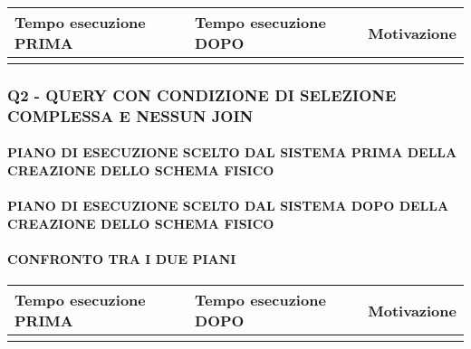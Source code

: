 \documentclass[a4paper]{article}
\begin{document}
\begin{center}
\begin{footnotesize}
\begin{tabular}{|p{3cm}|p{3cm}|p{7cm}|}
\hline
\parbox{3cm}{\bf Tempo esecuzione PRIMA} & \parbox{3cm}{\bf Tempo esecuzione DOPO} &  \parbox{7cm}{\bf Motivazione} \\
\hline
& &  \\
\hline
\end{tabular}
\end{footnotesize}
\end{center}

\subsubsection{Q2 - QUERY CON CONDIZIONE DI SELEZIONE COMPLESSA E NESSUN JOIN\\}

\paragraph*{PIANO DI ESECUZIONE SCELTO DAL SISTEMA PRIMA DELLA CREAZIONE DELLO SCHEMA FISICO\\}


\paragraph*{PIANO DI ESECUZIONE SCELTO DAL SISTEMA DOPO DELLA CREAZIONE DELLO SCHEMA FISICO\\}


\paragraph*{CONFRONTO TRA I DUE PIANI\\}



\begin{center}
\begin{footnotesize}
\begin{tabular}{|p{3cm}|p{3cm}|p{7cm}|}
\hline
\parbox{3cm}{\bf Tempo esecuzione PRIMA} & \parbox{3cm}{\bf Tempo esecuzione DOPO} &  \parbox{7cm}{\bf Motivazione} \\
\hline
& &  \\
\hline
\end{tabular}
\end{footnotesize}
\end{center}
\end{document}
